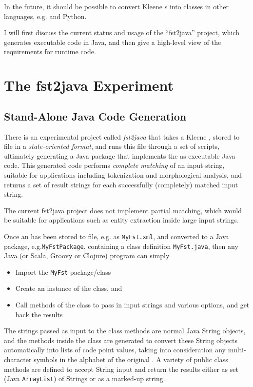 In the future, it should be possible to convert Kleene \fsm{}s into classes in other languages,
e.g.\@ \CPP{} and Python.

I will first discuss the current status and usage of the ``fst2java'' project, which generates
executable code in Java, and then give a high-level view of the requirements for runtime code.

\section{The fst2java Experiment}

\subsection{Stand-Alone Java Code Generation}

There is an experimental project called \emph{fst2java} that takes
a Kleene \fsm{}, stored to file in a \emph{state-oriented  format}, and runs
this  file through a set of  scripts, ultimately generating a Java package
that implements the \fsm{} as executable Java code.  This generated code performs \emph{complete
matching} of an input string, suitable for applications including tokenization and morphological
analysis, and returns a set of result strings for each successfully (completely) matched input
string.

The current fst2java project does not implement partial matching,
which would be suitable for applications such as entity extraction inside large input strings.

Once an \fsm{} has been stored to file, e.g. as \texttt{MyFst.xml}, and converted to 
a Java package, e.g.\@ \texttt{MyFstPackage}, containing a class definition
\texttt{MyFst.java}, then any Java (or Scala, Groovy or Clojure) program can simply

\begin{itemize}
\item
Import the \texttt{MyFst} package/class
\item
Create an instance of the class, and
\item
Call methods of the class to pass in input strings and various options, and get back the
results
\end{itemize}

\noindent The strings passed as input to the class methods are normal Java String objects, and the
methods inside the class are generated to convert these String objects automatically into lists of
code point values, taking into consideration any multi-character symbols in the alphabet of the
original \fsm{}.  A variety of public class methods are defined to accept String input and return
the results either as set (Java \texttt{ArrayList}) of Strings or as a marked-up  string.

